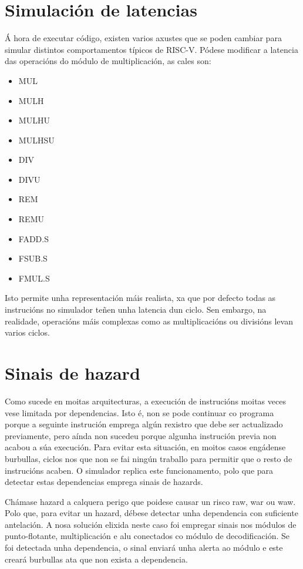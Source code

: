 \section{Simulación de latencias}\label{sec:sim_latencias}
Á hora de executar código, existen varios axustes que se poden cambiar para simular distintos comportamentos típicos de RISC-V. Pódese modificar a latencia  das operacións do módulo de multiplicación, as cales son: 
\begin{itemize}
    \item MUL
    \item MULH
    \item MULHU
    \item MULHSU
    \item DIV
    \item DIVU
    \item REM
    \item REMU
    \item FADD.S
    \item FSUB.S
    \item FMUL.S
\end{itemize}
Isto permite unha representación máis realista, xa que por defecto todas as instrucións no simulador teñen unha latencia dun ciclo. Sen embargo, na realidade, operacións máis complexas como as multiplicacións ou divisións levan varios ciclos.

\section{Sinais de hazard}\label{sec:hazards}
Como sucede en moitas \gls{arquitecturas}, a execución de instrucións moitas veces vese limitada por dependencias. Isto é, non se pode continuar co programa porque a seguinte instrución emprega algún rexistro que debe ser actualizado previamente, pero aínda non sucedeu porque algunha instrución previa non acabou a súa execución. Para evitar esta situación, en moitos casos engádense burbullas, ciclos nos que non se fai ningún traballo para permitir que o resto de instrucións acaben. O simulador replica este funcionamento, polo que para detectar estas dependencias emprega sinais de \gls{hazards}.

Chámase hazard a calquera perigo que poidese causar un risco \acrfull{raw}, \acrfull{war} ou \acrfull{waw}. Polo que, para evitar un hazard, débese detectar unha dependencia con suficiente antelación. A nosa solución elixida neste caso foi empregar sinais nos módulos de punto-flotante, multiplicación e \acrshort{alu} conectados co módulo de decodificación. Se foi detectada unha dependencia, o sinal enviará unha alerta ao módulo e este creará burbullas ata que non exista a dependencia.
